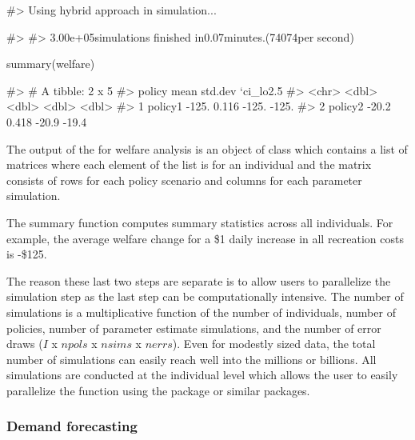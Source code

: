 \begin{Schunk}
\begin{Soutput}
#> Using hybrid approach in simulation...
\end{Soutput}
\begin{Soutput}
#> 
#> 3.00e+05simulations finished in0.07minutes.(74074per second)
\end{Soutput}
\begin{Sinput}
summary(welfare)
\end{Sinput}
\begin{Soutput}
#> # A tibble: 2 x 5
#>   policy    mean std.dev `ci_lo2.5%` `ci_hi97.5%`
#>   <chr>    <dbl>   <dbl>       <dbl>        <dbl>
#> 1 policy1 -125.    0.116      -125.        -125. 
#> 2 policy2  -20.2   0.418       -20.9        -19.4
\end{Soutput}
\end{Schunk}

The output of the  for welfare analysis is an object of
class  which contains a list of matrices where each
element of the list is for an individual and the matrix consists of rows
for each policy scenario and columns for each parameter simulation.

The summary function computes summary statistics across all individuals.
For example, the average welfare change for a \$1 daily increase in all
recreation costs is -\$125.

The reason these last two steps are separate is to allow users to
parallelize the simulation step as the last step can be computationally
intensive. The number of simulations is a multiplicative function of the
number of individuals, number of policies, number of parameter estimate
simulations, and the number of error draws (\(I\) x \(npols\) x
\(nsims\) x \(nerrs\)). Even for modestly sized data, the total number
of simulations can easily reach well into the millions or billions. All
simulations are conducted at the individual level which allows the user
to easily parallelize the  function using the
 package or similar packages.

\hypertarget{demand-forecasting}{%
\subsubsection{Demand forecasting}\label{demand-forecasting}}

